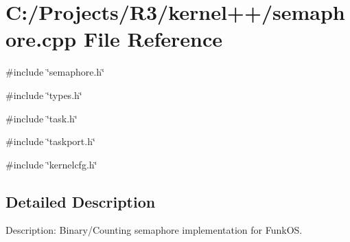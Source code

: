 \section{C:/Projects/R3/kernel++/semaphore.cpp File Reference}
\label{semaphore_8cpp}
{\ttfamily \#include \char`\"{}semaphore.h\char`\"{}}\par
{\ttfamily \#include \char`\"{}types.h\char`\"{}}\par
{\ttfamily \#include \char`\"{}task.h\char`\"{}}\par
{\ttfamily \#include \char`\"{}taskport.h\char`\"{}}\par
{\ttfamily \#include \char`\"{}kernelcfg.h\char`\"{}}\par


\subsection{Detailed Description}
Description: Binary/Counting semaphore implementation for FunkOS. 